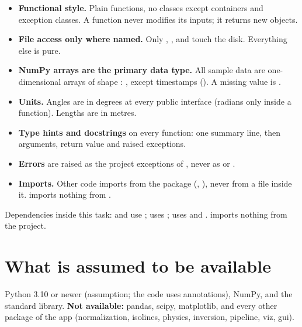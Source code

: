 \documentclass{article}
\begin{document}
\begin{itemize}
\item \textbf{Functional style.} Plain functions, no classes except
       containers and exception classes. A function never
      modifies its inputs; it returns new objects.
\item \textbf{File access only where named.} Only ,
      ,  and  touch the
      disk. Everything else is pure.
\item \textbf{NumPy arrays are the primary data type.} All sample data are
      one-dimensional arrays of shape : , except
      timestamps (). A missing value is .
\item \textbf{Units.} Angles are in degrees at every public interface
      (radians only inside a function). Lengths are in metres.
\item \textbf{Type hints and docstrings} on every function: one summary line,
      then arguments, return value and raised exceptions.
\item \textbf{Errors} are raised as the project exceptions of
      , never as  or .
\item \textbf{Imports.} Other code imports from the package
      (, ), never from a
      file inside it.  imports nothing from .
\end{itemize}

Dependencies inside this task:  and
 use ; 
uses ;  uses  and
.  imports nothing from the
project.

\section{What is assumed to be available}
\label{sec:assumed}

Python 3.10 or newer (assumption; the code uses  annotations),
NumPy, and the standard library. \textbf{Not available:} pandas, scipy,
matplotlib, and every other package of the app (normalization, isolines,
physics, inversion, pipeline, viz, gui).
\end{document}
